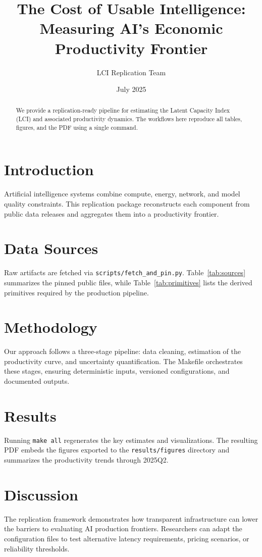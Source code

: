 \documentclass[11pt]{article}
\title{The Cost of Usable Intelligence: Measuring AI's Economic Productivity Frontier}
\author{LCI Replication Team}
\date{July 2025}
\begin{document}
\maketitle

\begin{abstract}
We provide a replication-ready pipeline for estimating the Latent Capacity Index (LCI) and associated productivity dynamics. The workflows here reproduce all tables, figures, and the PDF using a single command.
\end{abstract}

\section{Introduction}
Artificial intelligence systems combine compute, energy, network, and model quality constraints. This replication package reconstructs each component from public data releases and aggregates them into a productivity frontier.

\section{Data Sources}
Raw artifacts are fetched via \texttt{scripts/fetch\_and\_pin.py}. Table~\ref{tab:sources} summarizes the pinned public files, while Table~\ref{tab:primitives} lists the derived primitives required by the production pipeline.

\section{Methodology}
Our approach follows a three-stage pipeline: data cleaning, estimation of the productivity curve, and uncertainty quantification. The Makefile orchestrates these stages, ensuring deterministic inputs, versioned configurations, and documented outputs.

\section{Results}
Running \texttt{make all} regenerates the key estimates and visualizations. The resulting PDF embeds the figures exported to the \texttt{results/figures} directory and summarizes the productivity trends through 2025Q2.

\section{Discussion}
The replication framework demonstrates how transparent infrastructure can lower the barriers to evaluating AI production frontiers. Researchers can adapt the configuration files to test alternative latency requirements, pricing scenarios, or reliability thresholds.
\end{document}
